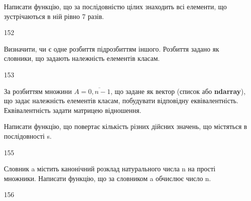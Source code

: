 Написати функцію, що за послідовністю цілих знаходить всі елементи, що зустрічаються в ній рівно 7 разів.
\\\par
152 














Визначити, чи є одне розбиття підрозбиттям іншого. Розбиття задано як словники, що задають належність елементів класам.
\\\par
153 














За розбиттям множини $A=\overline{0,n-1}$, що задане як вектор (список або  \textbf{ndarray}), що задає належність елементів класам, побудувати відповідну еквівалентність. Еквівалентність задати матрицею відношення.
\\\par
{} 














Написати функцію, що повертає кількість різних дійсних значень, що містяться в послідовності s.
\\\par
155 














Словник a містить канонічний розклад натурального числа n на прості множники. Написати функцію, що за словником a обчислює число n.
\\\par
156 














